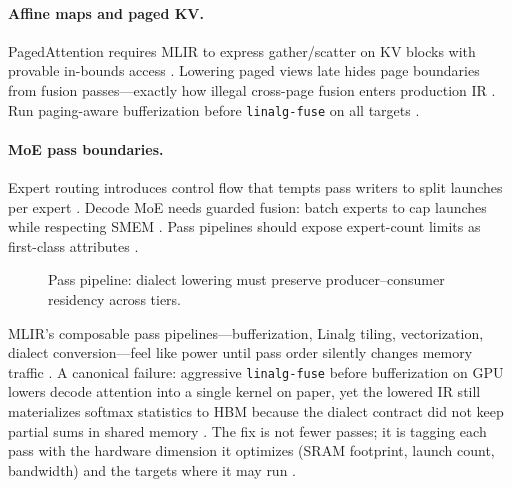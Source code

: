 \paragraph{Affine maps and paged KV.} PagedAttention requires MLIR to express gather/scatter on KV blocks with provable in-bounds access \citep{kwon2023vllm,dao2022flashattention}. Lowering paged views late hides page boundaries from fusion passes---exactly how illegal cross-page fusion enters production IR \citep{yirage2026,memoryfloor2026}. Run paging-aware bufferization before \texttt{linalg-fuse} on all targets \citep{taxbreak2026,amd2024aie}.

\paragraph{MoE pass boundaries.} Expert routing introduces control flow that tempts pass writers to split launches per expert \citep{taxbreak2026,liu2024deepseekv3}. Decode MoE needs guarded fusion: batch experts to cap launches while respecting SMEM \citep{yirage2026,patel2025llminference}. Pass pipelines should expose expert-count limits as first-class attributes \citep{chen2020compilerbasedhardw,nvidia2022hopper}.

\begin{figure}[t]
\centering
{}
\caption{Pass pipeline: dialect lowering must preserve producer--consumer residency across tiers.}
\label{fig:mlir_arch_passes_architecture}
\end{figure}

MLIR's composable pass pipelines---bufferization, Linalg tiling, vectorization, dialect conversion---feel like power until pass order silently changes memory traffic \citep{chen2020compilerbasedhardw}. A canonical failure: aggressive \texttt{linalg-fuse} before bufferization on GPU lowers decode attention into a single kernel on paper, yet the lowered IR still materializes softmax statistics to HBM because the dialect contract did not keep partial sums in shared memory \citep{dao2022flashattention,dao2023flashdecoding}. The fix is not fewer passes; it is tagging each pass with the hardware dimension it optimizes (SRAM footprint, launch count, bandwidth) and the targets where it may run \citep{yirage2026}.

